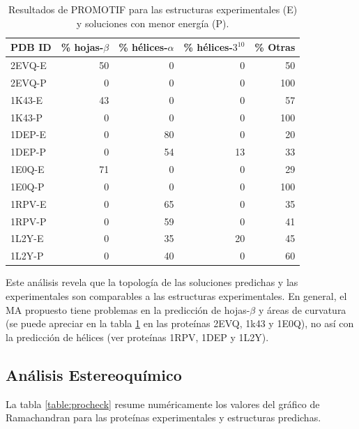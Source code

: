 \begin{table}[H]
\centering
\caption[Resultados PROMOTIF]{Resultados de PROMOTIF para las estructuras experimentales (E) y soluciones con menor energía (P).}

\begin{tabular}{|l|r|r|r|r|}\hline
{PDB ID} & \% hojas-$\beta$ & \% hélices-$\alpha$ & \% hélices-$3^{10}$ & \% Otras\\\hline

2EVQ-E & 50 & 0 & 0 & 50\\
2EVQ-P & 0 & 0 & 0 & 100\\\hline

1K43-E & 43  & 0 & 0 & 57\\
1K43-P & 0 & 0 & 0 & 100\\\hline

1DEP-E & 0 & 80 & 0 & 20\\
1DEP-P & 0 & 54 & 13 & 33\\\hline

1E0Q-E & 71 & 0 & 0 & 29\\
1E0Q-P & 0 & 0 & 0 & 100\\\hline

1RPV-E & 0 & 65 & 0 & 35\\
1RPV-P & 0 & 59 & 0 & 41\\\hline

1L2Y-E & 0 & 35 & 20 & 45\\
1L2Y-P & 0 & 40 & 0 & 60\\\hline
\end{tabular}
\label{table:stridess}
\end{table}

Este análisis revela que la topología de las soluciones predichas y las experimentales son comparables a las estructuras experimentales. En general, el MA propuesto tiene problemas en la predicción de hojas-$\beta$ y áreas de curvatura (se puede apreciar en la tabla \ref{table:stridess} en las proteínas 2EVQ, 1k43 y 1E0Q), no así con la predicción de hélices (ver proteínas 1RPV, 1DEP y 1L2Y).  

\subsection{Análisis Estereoquímico}

La tabla \ref{table:procheck} resume numéricamente los valores del gráfico de Ramachandran para las proteínas experimentales y estructuras predichas.

